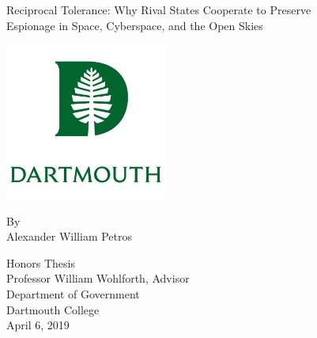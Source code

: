 
\begin{titlingpage}
\begin{center}
	\vspace*{0.5cm}
	\huge
	\SingleSpacing

	Reciprocal Tolerance: Why Rival States Cooperate to Preserve\\
	Espionage in Space, Cyberspace, and the Open Skies
	\vspace{1cm}

	\includegraphics[width=0.4\textwidth]{dartmouth-crest.jpg}

	\vspace{0.5cm}
	By\\
	Alexander William Petros



	\vfill
	\vspace{0.5cm}

	Honors Thesis\\
	Professor William Wohlforth, Advisor\\
	Department of Government\\
	Dartmouth College\\
	April 6, 2019

\end{center}
\end{titlingpage}
